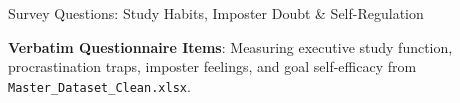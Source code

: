 \documentclass{beamer}
\begin{document}
\begin{frame}[t]{Survey Questions: Study Habits, Imposter Doubt \& Self-Regulation}
  \vspace{-0.20cm}
  \begin{topsummarybar}
    \fontsize{5.8pt}{7.0pt}\selectfont
    \textbf{\color{NavyDark}Verbatim Questionnaire Items}: Measuring executive study function, procrastination traps, imposter feelings, and goal self-efficacy from \texttt{Master\_Dataset\_Clean.xlsx}.
  \end{topsummarybar}
  \vspace{-0.25cm}


\end{frame}
\end{document}
